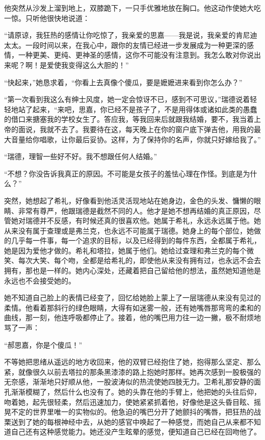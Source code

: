 \par 他突然从沙发上溜到地上，双膝跪下，一只手优雅地放在胸口。他这动作使她大吃一惊。只听他很快地说道：
\par “请原谅，我狂热的感情让你吃惊了，我亲爱的思嘉——我是说，我亲爱的肯尼迪太太。一段时间以来，在我心中，跟你的友情已经进一步发展成为一种更深的感情，一种更美、更纯、更神圣的感情，这你不可能没有注意到。我怎么敢对你说出来呢？啊！是爱使我变得这么大胆的！”
\par “快起来，”她恳求着，“你看上去真像个傻瓜，要是嬷嬷进来看到你怎么办？”
\par “第一次看到我这么有绅士风度，她一定会惊讶不已，感到不可思议，”瑞德说着轻轻地站了起来，“来吧，思嘉，你已经不是孩子了，不是用得体或诸如此类的愚蠢的借口来搪塞我的学校女生了。答应我，等我回来后就跟我结婚，要不，我当着上帝的面说，我就不去了。我要待在这，每天晚上在你的窗户底下弹吉他，用我的最大音量给你唱歌，让你最后妥协。这样，为了保持你的名声，你就只好嫁给我了。”
\par “瑞德，理智一些好不好。我不想跟任何人结婚。”
\par “不想？你没告诉我真正的原因。不可能是女孩子的羞怯心理在作怪。到底是为什么？”
\par 突然，她想起了希礼，好像看到他活灵活现地站在她身边，金色的头发、慵懒的眼睛、非常有尊严，他跟瑞德是截然不同的人。他才是她不想再结婚的真正原因，尽管她对瑞德并不反感，有时候还真的很喜欢他。她属于希礼，永远永远属于他。她从来没有属于查理或是弗兰克，也永远不可能属于瑞德。她身上的每个部位，她做的几乎每一件事，每一个追求的目标，以及已经得到的每件东西，全都属于希礼，她是因为爱他才做的。希礼和塔拉，她属于他们。她给过查理和弗兰克的每个微笑、每次大笑、每个吻，全都是给希礼的，即使他从来没有拥有过，也永远不会去拥有，那也是一样的。她内心深处，还藏着把自己留给他的想法，虽然她知道他是永远也不会接受她的。
\par 她不知道自己脸上的表情已经变了，回忆给她脸上蒙上了一层瑞德从来没有见过的柔情。他看着那斜行的绿色眼睛，大得有如迷雾一般，还有她嘴唇那弯弯的柔和的曲线，那一刻，他连呼吸都停止了。接着，他的嘴巴用力往一边一撇，极不耐烦地骂了一声：
\par “郝思嘉，你是个傻瓜！”
\par 不等她把思绪从遥远的地方收回来，他的双臂已经抱住了她，抱得那么坚定、那么紧，就像很久以前去塔拉的那条黑漆漆的路上抱她时那样。她再次感到一股极强的无奈感，渐渐地只好顺从他，一股波涛似的热流使她四肢无力。卫希礼那安静的面孔渐渐模糊了，然后什么也没有了。她的头靠在他的手臂上，他把她的头往后仰，吻着她，起先很轻柔，然后迅速加力，使她紧紧抓着他，好像他是这头昏目眩、摇晃不定的世界里唯一的实物似的。他急迫的嘴巴分开了她颤抖的嘴唇，把狂热的战栗送到了她的每根神经中去，从她的感官中唤起了一种感觉，而她自己从来都不知道自己还有这种感觉能力。她还没产生眩晕的感觉，便知道自己已经在回吻他了。
